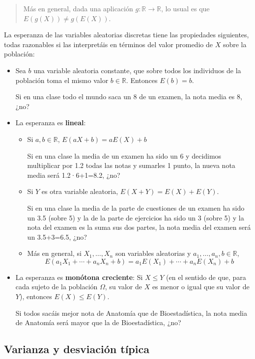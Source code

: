 \documentclass[
  spanish,
  letterpaper,
  DIV=11,
  numbers=noendperiod]{scrreprt}
\begin{document}
\begin{tcolorbox}
\begin{quote}
Más en general, dada una aplicación \(g:\mathbb{R}\to  \mathbb{R}\), lo
usual es que \(E(g(X))\neq g(E(X))\).
\end{quote}

La esperanza de las variables aleatorias discretas tiene las propiedades
siguientes, todas razonables si las interpretáis en términos del valor
promedio de \(X\) sobre la población:

\begin{itemize}
\item
  Sea \(b\) una variable aleatoria constante, que sobre todos los
  individuos de la población toma el mismo valor \(b\in \mathbb{R}\).
  Entonces \(E(b)=b\).

  Si en una clase todo el mundo saca un 8 de un examen, la nota media es
  8, ¿no?
\item
  La esperanza es \textbf{lineal}:

  \begin{itemize}
  \item
    Si \(a,b\in \mathbb{R}\), \(E(aX+b)=aE(X)+b\)

    Si en una clase la media de un examen ha sido un 6 y decidimos
    multiplicar por 1.2 todas las notas y sumarles 1 punto, la nueva
    nota media será 1.2·6+1=8.2, ¿no?
  \item
    Si \(Y\) es otra variable aleatoria, \(E(X+Y)=E(X)+E(Y)\).

    Si en una clase la media de la parte de cuestiones de un examen ha
    sido un 3.5 (sobre 5) y la de la parte de ejercicios ha sido un 3
    (sobre 5) y la nota del examen es la suma sus dos partes, la nota
    media del examen será un 3.5+3=6.5, ¿no?
  \item
    Más en general, si \(X_1,\ldots,X_n\) son variables aleatorias y
    \(a_1,\ldots,a_n,b\in \mathbb{R}\), \[
    E(a_1X_1+\cdots +a_nX_n+b)=a_1E(X_1)+\cdots +a_nE(X_n)+b
    \]
  \end{itemize}
\item
  La esperanza es \textbf{monótona creciente}: Si \(X\leqslant Y\) (en
  el sentido de que, para cada sujeto de la población \(\Omega\), su
  valor de \(X\) es menor o igual que su valor de \(Y\)), entonces
  \(E(X)\leqslant E(Y)\).

  Si todos sacáis mejor nota de Anatomía que de Bioestadística, la nota
  media de Anatomía será mayor que la de Bioestadística, ¿no?
\end{itemize}

\subsection{Varianza y desviación
típica}\label{varianza-y-desviaciuxf3n-tuxedpica}


\end{tcolorbox}
\end{document}
